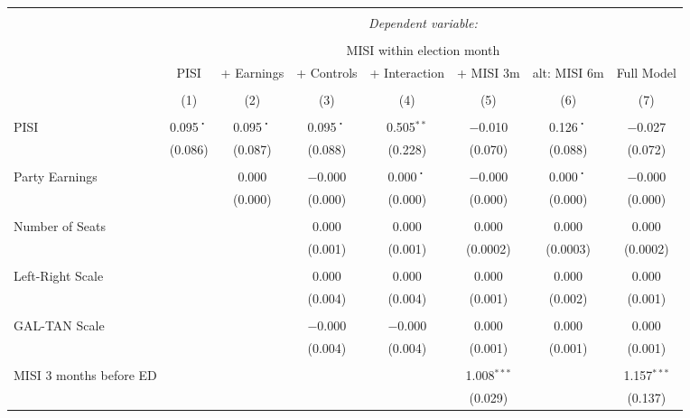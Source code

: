

\begin{tabular}{@{\extracolsep{5pt}}lccccccc} 
\\[-1.8ex]\hline 
\hline \\[-1.8ex] 
 & \multicolumn{7}{c}{\textit{Dependent variable:}} \\ 
\cline{2-8} 
\\[-1.8ex] & \multicolumn{7}{c}{MISI within election month} \\ 
 & PISI & + Earnings & + Controls & + Interaction & + MISI 3m & alt: MISI 6m & Full Model \\ 
\\[-1.8ex] & (1) & (2) & (3) & (4) & (5) & (6) & (7)\\ 
\hline \\[-1.8ex] 
 PISI & 0.095$^{・}$ & 0.095$^{・}$ & 0.095$^{・}$ & 0.505$^{**}$ & $-$0.010 & 0.126$^{・}$ & $-$0.027 \\ 
  & (0.086) & (0.087) & (0.088) & (0.228) & (0.070) & (0.088) & (0.072) \\ 
  & & & & & & & \\ 
 Party Earnings &  & 0.000 & $-$0.000 & 0.000$^{・}$ & $-$0.000 & 0.000$^{・}$ & $-$0.000 \\ 
  &  & (0.000) & (0.000) & (0.000) & (0.000) & (0.000) & (0.000) \\ 
  & & & & & & & \\ 
 Number of Seats &  &  & 0.000 & 0.000 & 0.000 & 0.000 & 0.000 \\ 
  &  &  & (0.001) & (0.001) & (0.0002) & (0.0003) & (0.0002) \\ 
  & & & & & & & \\ 
 Left-Right Scale &  &  & 0.000 & 0.000 & 0.000 & 0.000 & 0.000 \\ 
  &  &  & (0.004) & (0.004) & (0.001) & (0.002) & (0.001) \\ 
  & & & & & & & \\ 
 GAL-TAN Scale &  &  & $-$0.000 & $-$0.000 & 0.000 & 0.000 & 0.000 \\ 
  &  &  & (0.004) & (0.004) & (0.001) & (0.001) & (0.001) \\ 
  & & & & & & & \\ 
 MISI 3 months before ED &  &  &  &  & 1.008$^{***}$ &  & 1.157$^{***}$ \\ 
  &  &  &  &  & (0.029) &  & (0.137) \\ 

\end{tabular}
